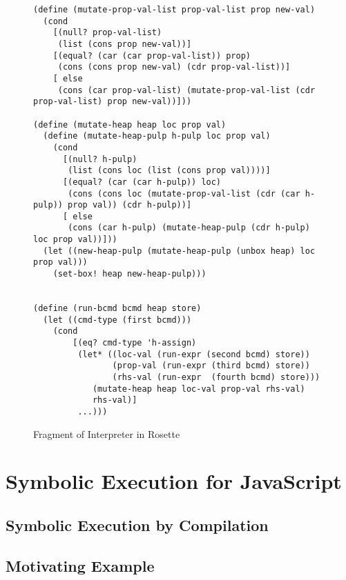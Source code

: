 \begin{figure}
\begin{lstlisting}
(define (mutate-prop-val-list prop-val-list prop new-val)
  (cond
    [(null? prop-val-list)
     (list (cons prop new-val))]
    [(equal? (car (car prop-val-list)) prop)
     (cons (cons prop new-val) (cdr prop-val-list))]
    [ else
     (cons (car prop-val-list) (mutate-prop-val-list (cdr prop-val-list) prop new-val))]))

(define (mutate-heap heap loc prop val)
  (define (mutate-heap-pulp h-pulp loc prop val)
    (cond
      [(null? h-pulp)
       (list (cons loc (list (cons prop val))))]
      [(equal? (car (car h-pulp)) loc)
       (cons (cons loc (mutate-prop-val-list (cdr (car h-pulp)) prop val)) (cdr h-pulp))]
      [ else
       (cons (car h-pulp) (mutate-heap-pulp (cdr h-pulp) loc prop val))]))
  (let ((new-heap-pulp (mutate-heap-pulp (unbox heap) loc prop val)))
    (set-box! heap new-heap-pulp)))


(define (run-bcmd bcmd heap store)
  (let ((cmd-type (first bcmd)))
    (cond
    	[(eq? cmd-type 'h-assign)
      	 (let* ((loc-val (run-expr (second bcmd) store))
                (prop-val (run-expr (third bcmd) store))
                (rhs-val (run-expr  (fourth bcmd) store)))
            (mutate-heap heap loc-val prop-val rhs-val)
            rhs-val)]
         ...)))
\end{lstlisting}
\caption{Fragment of \jsil Interpreter in Rosette}
\end{figure}


\section{Symbolic Execution for JavaScript}

\subsection{Symbolic Execution by Compilation} 

\subsection{Motivating Example} 

